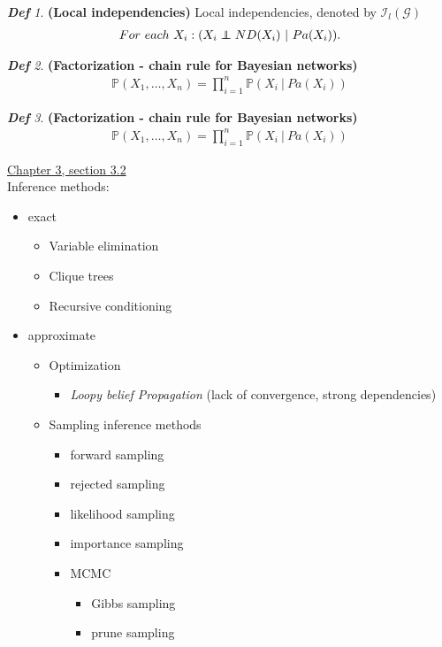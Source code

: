 \documentclass{amsart}
\newcommand\indep{\protect\mathpalette{\protect\independenT}{\perp}}
\def\independenT#1#2{\mathrel{\rlap{$#1#2$}\mkern2mu{#1#2}}}
\theoremstyle{plain}
\theoremstyle{remark}
\newtheorem*{definition*}{\textbf{\em Def}}
\theoremstyle{plain}
\renewcommand{\P}{{\mathbb P}}
\newcommand{\G}{{\mathcal G}}
\newcommand{\I}{{\mathcal{I}}}
\newcommand{\vs}{\vspace{0.75pc}}
\begin{document}
\begin{definition*}\textbf{ (Local independencies) }
Local independencies, denoted by $\I_l(\G)$
\begin{align*}
For\ each\ X_i: (X_i \indep ND(X_i)\ |\ Pa(X_i)).
\end{align*}
\end{definition*}\vs

\begin{definition*}\textbf{ (Factorization - chain rule for Bayesian networks) }
\begin{align*}
\P(X_1, \ldots , X_n) = \prod_{i=1}^n \P(X_i\ |\ Pa(X_i))
\end{align*}
\end{definition*}\vs

\begin{definition*}\textbf{ (Factorization - chain rule for Bayesian networks) }
\begin{align*}
\P(X_1, \ldots , X_n) = \prod_{i=1}^n \P(X_i\ |\ Pa(X_i))
\end{align*}
\end{definition*}\vs

\underline{Chapter 3, section 3.2} \\
Inference methods:
\begin{itemize}
\item exact
\begin{itemize}
\item Variable elimination
\item Clique trees
\item Recursive conditioning
\end{itemize}
\item approximate
\begin{itemize}
\item Optimization
\begin{itemize}
\item \textit{Loopy belief Propagation} (lack of convergence, strong dependencies)
\end{itemize}
\item Sampling inference methods
\begin{itemize}
\item forward sampling
\item rejected sampling
\item likelihood sampling
\item importance sampling
\item MCMC
\begin{itemize}
\item Gibbs sampling
\item prune sampling
\end{itemize}
\end{itemize}
\end{itemize}
\end{itemize}\vs 
\end{document}
